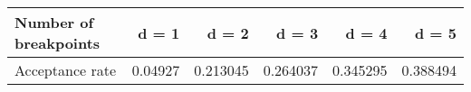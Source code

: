 \begin{tabular}{lrrrrr}
\toprule
Number of breakpoints &    d = 1 &     d = 2 &     d = 3 &     d = 4 &     d = 5 \\
\midrule
      Acceptance rate &  0.04927 &  0.213045 &  0.264037 &  0.345295 &  0.388494 \\
\bottomrule
\end{tabular}
